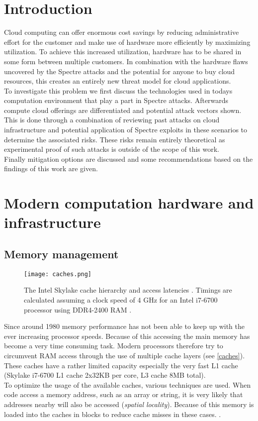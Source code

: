\documentclass[conference,compsoc,final,a4paper]{IEEEtran}
\begin{document}
\section{Introduction}
Cloud computing can offer enormous cost savings by reducing administrative effort for the customer and make use of hardware more efficiently by maximizing utilization. To achieve this increased utilization, hardware has to be shared in some form between multiple customers. \cite{mell2011nist} In combination with the hardware flaws uncovered by the Spectre attacks and the potential for anyone to buy cloud resources, this creates an entirely new threat model for cloud applications. \\
To investigate this problem we first discuss the technologies used in todays computation environment that play a part in Spectre attacks. Afterwards compute cloud offerings are differentiated and potential attack vectors shown. This is done through a combination of reviewing past attacks on cloud infrastructure and potential application of Spectre exploits in these scenarios to determine the associated risks. These risks remain entirely theoretical as experimental proof of such attacks is outside of the scope of this work. \\
Finally mitigation options are discussed and some recommendations based on the findings of this work are given.

\section{Modern computation hardware and infrastructure}
\subsection{Memory management}
\begin{figure}[!ht]
\centering
\texttt{[image: caches.png]}
\caption{The Intel Skylake cache hierarchy and access latencies \cite{fog2012microarchitecture}. Timings are calculated assuming a clock speed of 4 GHz for an Intel i7-6700 processor using DDR4-2400 RAM \cite{skylakeBenchmark}. }
\label{caches}
\end{figure}
Since around 1980 memory performance has not been able to keep up with the ever increasing processor speeds. \cite[p.~73]{hennessy2011computer} Because of this accessing the main memory has become a very time consuming task. Modern processors therefore try to circumvent RAM access through the use of multiple cache layers (see \autoref{caches}). These caches have a rather limited capacity especially the very fast L1 cache (Skylake i7-6700 L1 cache 2x32KB per core, L3 cache 8MB total). \cite{skylakeBenchmark} \\
To optimize the usage of the available caches, various techniques are used. When code access a memory address, such as an array or string, it is very likely that addresses nearby will also be accessed (\emph{spatial locality}). Because of this memory is loaded into the caches in blocks to reduce cache misses in these cases. \cite[p.~74]{hennessy2011computer}. \\
\end{document}
